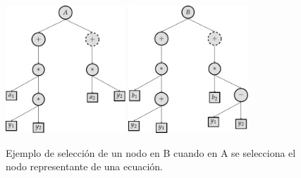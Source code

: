 \begin{itemize}
\begin{center}
              \begin{figure}[h]
                  \centering
                  \includegraphics[width=0.4\textwidth]{"figures/cross_equation_1.pdf"}
                  \qquad
                  \includegraphics[width=0.4\textwidth]{"figures/cross_equation_2.pdf"}
                  \caption{Ejemplo de selección de un nodo en B cuando en A se selecciona el nodo representante de una ecuación.}
                  \label{tikzpicture:cross_equation}
              \end{figure}
          \end{center}


\end{itemize}

